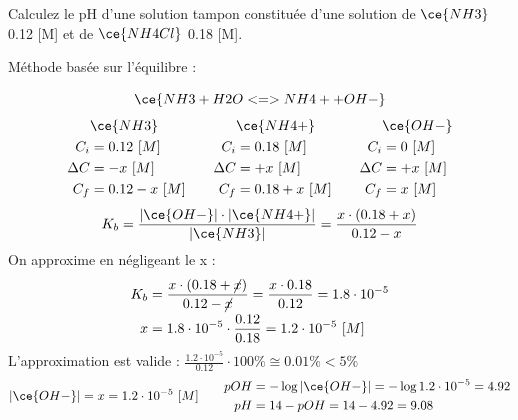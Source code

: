 \documentclass[
  11pt,
  a4paper,
  openany]{book}
\begin{document}
\begin{Exercise}
Calculez le pH d'une solution tampon constituée d'une solution de \(\ce{NH3}\) 0.12 {[}M{]} et de \(\ce{NH4Cl}\) 0.18 {[}M{]}.

\end{Exercise}

\begin{Answer}
Méthode basée sur l'équilibre :

\[
\ce{NH3 + H2O <=> NH4+ + OH-}
\]
\[
\begin{split}
&\ce{NH3}\\
C_i &= 0.12\ [M] \\
\Delta C &= - x\ [M] \\
C_f &= 0.12 - x\ [M] \\
\end{split}
\qquad
\begin{split}
&\ce{NH4+}\\
C_i &= 0.18\ [M] \\
\Delta C &= + x\ [M] \\
C_f &= 0.18 + x\ [M] \\
\end{split}
\qquad
\begin{split}
&\ce{OH-}\\
C_i &= 0\ [M] \\
\Delta C &= + x\ [M] \\
C_f &= x\ [M] \\
\end{split}
\]
\[
K_b = \frac{|\ce{OH-}| \cdot |\ce{NH4+}|}{|\ce{NH3}|} = \frac{x \cdot (0.18 + x)}{0.12 - x}
\]
On approxime en négligeant le x :
\[
\begin{split}
K_b &= \frac{x \cdot (0.18 + \cancel{x})}{0.12 - \cancel{x}} = \frac{x \cdot 0.18}{0.12} = 1.8 \cdot 10^{-5} \\
x &= 1.8 \cdot 10^{-5} \cdot \frac{0.12}{0.18} = 1.2 \cdot 10^{-5}\ [M]
\end{split}
\]
L'approximation est valide : \(\frac{1.2 \cdot 10^{-5}}{0.12} \cdot 100\% \cong 0.01\% < 5\%\)
\[
\begin{split}
|\ce{OH-}| = x = 1.2 \cdot 10^{-5}\ [M] 
\end{split}
\qquad
\begin{split}
pOH &= - \log |\ce{OH-}| = - \log 1.2 \cdot 10^{-5} = 4.92 \\
pH &= 14 - pOH = 14 - 4.92 = 9.08
\end{split}
\]


\end{Answer}
\end{document}
